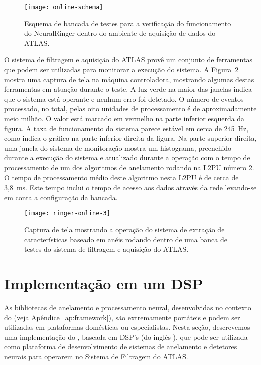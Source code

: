\begin{figure}
\begin{center}
\texttt{[image: online-schema]}
\end{center}
\caption{Esquema de bancada de testes para a verificação do funcionamento do
NeuralRinger dentro do ambiente de aquisição de dados do ATLAS.}
\label{fig:online-schema}
\end{figure}

O sistema de filtragem e aquisição do ATLAS provê um conjunto de ferramentas
que podem ser utilizadas para monitorar a execução do sistema. A
Figura~\ref{fig:ringer-screenshot} mostra uma captura de tela na máquina
controladora, mostrando algumas destas ferramentas em atuação durante o
teste. A luz verde na maior das janelas indica que o sistema está operante e
nenhum erro foi detetado. O número de eventos processado, no total, pelas oito
unidades de processamento é de aproximadamente meio milhão. O valor está
marcado em vermelho na parte inferior esquerda da figura. A taxa de
funcionamento do sistema parece estável em cerca de 245~Hz, como indica o
gráfico na parte inferior direita da figura. Na parte superior direita, uma
janela do sistema de monitoração  mostra um histograma, preenchido
durante a execução do sistema e atualizado durante a operação com o tempo de
processamento de um dos algoritmos de anelamento rodando na L2PU número 2. O
tempo de processamento médio deste algoritmo nesta L2PU é de cerca de
3,8~ms. Este tempo inclui o tempo de acesso aos dados através da rede
 levando-se em conta a configuração da bancada.

\begin{figure}
\begin{center}
\texttt{[image: ringer-online-3]}
\end{center}
\caption{Captura de tela mostrando a operação do sistema de extração de
características baseado em anéis rodando dentro de uma banca de testes do
sistema de filtragem e aquisição do ATLAS.}
\label{fig:ringer-screenshot}
\end{figure}

\section{Implementação em um DSP}

As bibliotecas de anelamento e processamento neural, desenvolvidas no contexto
do  (veja Apêndice~\ref{ap:framework}), são extremamente
portáteis e podem ser utilizadas em plataformas domésticas ou
especialistas. Nesta seção, descrevemos uma implementação do
, baseada em DSP's (do inglês ), que pode ser utilizada como plataforma de desenvolvimento de
sistemas de anelamento e detetores neurais para operarem no Sistema de
Filtragem do ATLAS.

